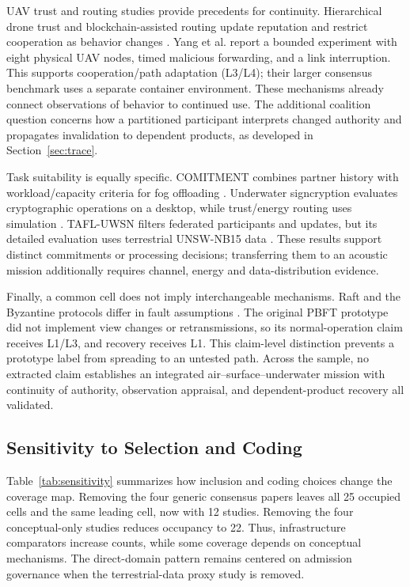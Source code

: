 \documentclass[blockchains,review,accept,moreauthors]{Definitions/mdpi}
\begin{document}
UAV trust and routing studies provide precedents for continuity. Hierarchical drone trust and blockchain-assisted routing update reputation and restrict cooperation as behavior changes \citep{hierarchical2023trust,yang2023trusted}. Yang et al. report a bounded experiment with eight physical UAV nodes, timed malicious forwarding, and a link interruption. This supports cooperation/path adaptation (L3/L4); their larger consensus benchmark uses a separate container environment. These mechanisms already connect observations of behavior to continued use. The additional coalition question concerns how a partitioned participant interprets changed authority and propagates invalidation to dependent products, as developed in Section~\ref{sec:trace}.

Task suitability is equally specific. COMITMENT combines partner history with workload/capacity criteria for fog offloading \citep{alkhafajiy2020comitment}. Underwater signcryption evaluates cryptographic operations on a desktop, while trust/energy routing uses simulation \citep{zhang2026underwater,eetauv2025trust}. TAFL-UWSN filters federated participants and updates, but its detailed evaluation uses terrestrial UNSW-NB15 data \citep{tafl2026underwater}. These results support distinct commitments or processing decisions; transferring them to an acoustic mission additionally requires channel, energy and data-distribution evidence.

Finally, a common cell does not imply interchangeable mechanisms. Raft and the Byzantine protocols differ in fault assumptions \citep{raft2014,pbft1999,hotstuff2019,narwhal2022}. The original PBFT prototype did not implement view changes or retransmissions, so its normal-operation claim receives L1/L3, and recovery receives L1. This claim-level distinction prevents a prototype label from spreading to an untested path. Across the sample, no extracted claim establishes an integrated air--surface--underwater mission with continuity of authority, observation appraisal, and dependent-product recovery all validated.

\subsection{Sensitivity to Selection and Coding}\label{sec:sensitivity}

Table~\ref{tab:sensitivity} summarizes how inclusion and coding choices change the coverage map. Removing the four generic consensus papers leaves all 25 occupied cells and the same leading cell, now with 12 studies. Removing the four conceptual-only studies reduces occupancy to 22. Thus, infrastructure comparators increase counts, while some coverage depends on conceptual mechanisms. The direct-domain pattern remains centered on admission governance when the terrestrial-data proxy study is removed.
\end{document}
